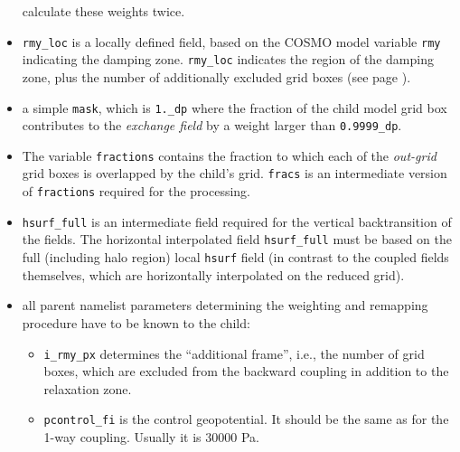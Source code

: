 \documentclass[11pt,twoside]{article}
\begin{document}
\begin{itemize}
calculate these weights twice.
\item \verb|rmy_loc| is a locally defined field, based on the COSMO
model variable \verb|rmy| indicating the damping zone. \verb|rmy_loc|
indicates the region of the damping zone, plus the number of
additionally excluded grid boxes (see page \pageref{page:addframe}).
\item a simple \verb|mask|, which is \verb|1._dp| where the fraction of
the child model grid box contributes to the {\it exchange field}
 by a weight larger than \verb|0.9999_dp|.
\item The variable \verb|fractions| contains the fraction to which
each of the {\it out-grid} grid boxes is overlapped by the child's
grid. \verb|fracs| 
is an intermediate version of \verb|fractions| required for the processing.
\item \verb|hsurf_full| is an intermediate field required for the
vertical backtransition of the fields. The horizontal
interpolated field \verb|hsurf_full| must be based on the full (including halo
region) local \verb|hsurf| field (in contrast to the coupled fields
themselves, which are horizontally interpolated on the reduced grid).
\item all parent namelist parameters determining the weighting and
remapping procedure have to be known to the child:
\begin{itemize} %
\item \verb|i_rmy_px| determines the ``additional frame'', i.e., the
number of grid boxes, which are excluded 
from the backward coupling in addition to the relaxation zone.
\item \verb|pcontrol_fi| is the control geopotential. It should be the
same as for the 1-way coupling. Usually it is 30000 Pa.


\end{itemize}
\end{itemize}
\end{document}
